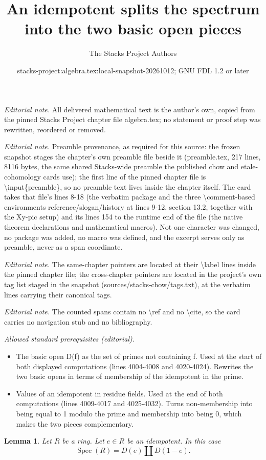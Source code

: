 \documentclass[10pt,a4paper]{amsart}
\title{An idempotent splits the spectrum into the two basic open pieces}
\author{The Stacks Project Authors}
\date{stacks-project:algebra.tex:local-snapshot-20261012; GNU FDL 1.2 or later}
\theoremstyle{plain}
\newtheorem{lemma}[subsection]{Lemma}
\theoremstyle{definition}
\theoremstyle{remark}
\numberwithin{equation}{subsection}
\def\Spec{\mathop{\mathrm{Spec}}}
\begin{document}
\maketitle
\noindent\textit{Editorial note.} All delivered mathematical text is the author's own, copied from the pinned Stacks Project chapter file algebra.tex; no statement or proof step was rewritten, reordered or removed.\par\medskip
\noindent\textit{Editorial note.} Preamble provenance, as required for this source: the frozen snapshot stages the chapter's own preamble file beside it (preamble.tex, 217 lines, 8116 bytes, the same shared Stacks-wide preamble the published chow and etale-cohomology cards use); the first line of the pinned chapter file is \textbackslash{}input\{preamble\}, so no preamble text lives inside the chapter itself. The card takes that file's lines 8-18 (the verbatim package and the three \textbackslash{}comment-based environments reference/slogan/history at lines 9-12, section 13.2, together with the Xy-pic setup) and its lines 154 to the runtime end of the file (the native theorem declarations and mathematical macros). Not one character was changed, no package was added, no macro was defined, and the excerpt serves only as preamble, never as a span coordinate.\par\medskip
\noindent\textit{Editorial note.} The same-chapter pointers are located at their \textbackslash{}label lines inside the pinned chapter file; the cross-chapter pointers are located in the project's own tag list staged in the snapshot (sources/stacks-chow/tags.txt), at the verbatim lines carrying their canonical tags.\par\medskip
\noindent\textit{Editorial note.} The counted spans contain no \textbackslash{}ref and no \textbackslash{}cite, so the card carries no navigation stub and no bibliography.\par\medskip
\noindent\textit{Allowed standard prerequisites (editorial).}\begin{itemize}
\item The basic open D(f) as the set of primes not containing f. Used at the start of both displayed computations (lines 4004-4008 and 4020-4024). Rewrites the two basic opens in terms of membership of the idempotent in the prime.
\item Values of an idempotent in residue fields. Used at the end of both computations (lines 4009-4017 and 4025-4032). Turns non-membership into being equal to 1 modulo the prime and membership into being 0, which makes the two pieces complementary.
\end{itemize}\medskip
\begin{lemma}
\label{lemma-idempotent-spec}
Let $R$ be a ring. Let $e \in R$ be an idempotent.
In this case
$$
\Spec(R) = D(e) \amalg D(1-e).
$$
\end{lemma}
\end{document}
